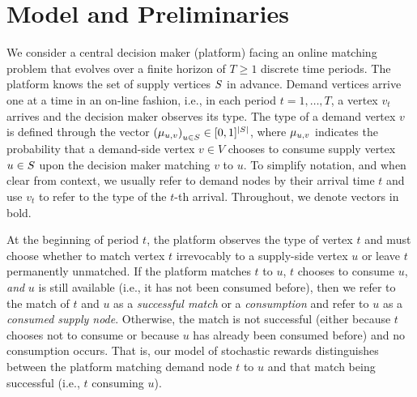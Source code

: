 \section{Model and Preliminaries}
\label{sec: model}


We consider a central decision maker (platform) facing an online matching problem that evolves over a finite horizon of $T\geq1$ discrete time periods. The platform knows the set of supply vertices $S$ in advance. Demand vertices arrive one at a time in an on-line fashion, i.e., in each period $t = 1, \ldots, T$, a vertex $v_t$ arrives and the decision maker observes its type. The type of a demand vertex $v$ is defined through the vector ${(\mu_{u,v})}_{u\in S} \in [0,1]^{|S|}$,  where $\mu_{u,v}$ indicates the probability that a demand-side vertex $v \in V$ chooses to consume supply vertex $u \in S$ upon the decision maker matching $v$ to $u$. To simplify notation, and when clear from context, we usually refer to demand nodes by their arrival time $t$ and use $v_t$ to refer to the type of the $t$-th arrival. Throughout, we denote vectors in bold.


{At the beginning of period $t$, the platform observes the type of vertex $t$ and must choose whether to match vertex $t$ irrevocably to a supply-side vertex $u$ or leave $t$ permanently unmatched.
If the platform matches $t$ to $u$, $t$ chooses to consume $u$, \emph{and}  $u$ is still available (i.e., it has not been consumed before), then we refer to the match of $t$ and $u$ as a \textit{successful match} or a \textit{consumption} and refer to $u$ as a \emph{consumed supply node}. Otherwise, the match is not successful (either because $t$ chooses not to consume or because $u$ has already been consumed before) and no consumption occurs. That is, our model of stochastic rewards distinguishes between the platform matching demand node $t$ to $u$ and that match being successful (i.e., $t$ consuming $u$). }


